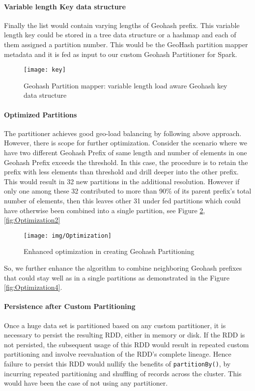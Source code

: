 \documentclass[article,type=msc,colorback,12pt,accentcolor=tud1d]{tudthesis}
\begin{document}
			\paragraph{Variable length Key data structure}
				\par Finally the list would contain varying lengths of Geohash prefix. This variable length key could be stored in a tree data structure or a hashmap and each of them assigned a partition number. This would be the GeoHash partition mapper metadata and it is fed as input to our custom Geohash Partitioner for Spark. \\
			
					\begin{figure}[h]
						\centering
						\texttt{[image: key]}
						\caption{Geohash Partition mapper: variable length load aware Geohash key data structure}
						\label{fig:keydatastrucutre}
					\end{figure}
			 \clearpage
			\paragraph{Optimized Partitions}
			The partitioner achieves good geo-load balancing by following above approach. However, there is scope for further optimization. Consider the scenario where we have two different Geohash Prefix of same length and number of elements in one Geohash Prefix exceeds the threshold. In this case, the procedure is to retain the prefix with less elements than threshold and drill deeper into the other prefix. This would result in 32 new partitions in the additional resolution. However if only one among these 32 contributed to more than 90\% of its parent prefix's total number of elements, then this leaves other 31 under fed partitions which could have otherwise been combined into a single partition, see Figure \ref{fig:Optimization}, \ref{fig:Optimization2}
									
				\begin{figure} [h]
				\centering
				\texttt{[image: img/Optimization]}
				\caption{Enhanced optimization in creating Geohash Partitioning}
				\label{fig:Optimization}
				\end{figure}
			So, we further enhance the algorithm to combine neighboring Geohash prefixes that could stay well as in a single partitions as demonstrated in the Figure \ref{fig:Optimization4}.		
			
			\paragraph{Persistence after Custom Partitioning}		
			Once a huge data set is partitioned based on any custom partitioner, it is necessary to persist the resulting RDD, either in memory or disk. If the RDD is not persisted, the subsequent usage of this RDD would result in repeated custom partitioning and involve reevaluation of the RDD's complete lineage. Hence failure to persist this RDD would nullify the benefits of \texttt{partitionBy()}, by incurring repeated partitioning and shuffling of records across the cluster. This would have been the case of not using any partitioner. \cite{sparkbook}
			
\end{document}
